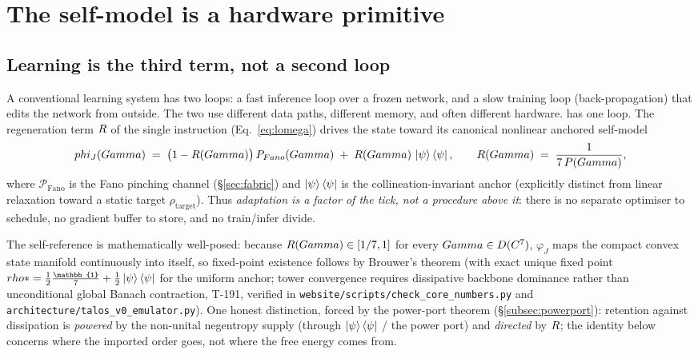 \section{The self-model is a hardware primitive}
\label{sec:selfmodel}

\subsection{Learning is the third term, not a second loop}

A conventional learning system has two loops: a fast inference loop over a
frozen network, and a slow training loop (back-propagation) that edits the
network from outside. The two use different data paths, different memory, and
often different hardware. \TALOS{} has one loop. The regeneration term
$R$ of the single instruction (Eq.~\ref{eq:lomega}) drives the state
toward its canonical nonlinear anchored self-model
\begin{equation*}
phi_J(Gamma) \;=\; \bigl(1 - R(Gamma)\bigr)\,P_{Fano}(Gamma)
\;+\; R(Gamma)\,\ket{\psi}\bra{\psi},
\qquad R(Gamma) \;=\; \frac{1}{7\,P(Gamma)},
\end{equation*}
where $\mathcal{P}_{\mathrm{Fano}}$ is the Fano pinching channel
(\S\ref{sec:fabric}) and $\ket{\psi}\bra{\psi}$ is the collineation-invariant
anchor (explicitly distinct from linear relaxation toward a static target
$\rho_{\mathrm{target}}$). Thus \emph{adaptation is a factor of the tick, not a
procedure above it}: there is no separate optimiser to schedule, no gradient
buffer to store, and no train/infer divide.

The self-reference is mathematically well-posed: because $R(Gamma)\in[1/7,1]$
for every $Gamma\in D(C^7)$, $\varphi_J$ maps the compact convex
state manifold continuously into itself, so fixed-point existence follows by
Brouwer's theorem (with exact unique fixed point
$\rhostar = \tfrac12\tfrac{\mathbb{1}}{7} + \tfrac12\ket{\psi}\bra{\psi}$ for
the uniform anchor; tower convergence requires dissipative backbone dominance
rather than unconditional global Banach contraction, T-191, verified in
\texttt{website/scripts/check\_core\_numbers.py} and
\texttt{architecture/talos\_v0\_emulator.py}). One honest distinction, forced
by the power-port theorem (\S\ref{subsec:powerport}): retention against
dissipation is \emph{powered} by the non-unital negentropy supply (through
$\ket{\psi}\bra{\psi}$ / the power port) and \emph{directed} by $R$; the
identity below concerns where the imported order goes, not where the free
energy comes from.

